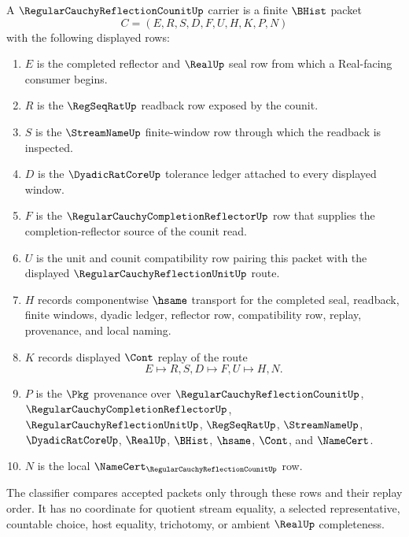 \begin{definition}
\label{def:regular-cauchy-reflection-counit-carrier}
A $\RegularCauchyReflectionCounitUp$ carrier is a finite $\BHist$ packet
$$
C=(E,R,S,D,F,U,H,K,P,N)
$$
with the following displayed rows:
\begin{enumerate}
\item $E$ is the completed reflector and $\RealUp$ seal row from which a Real-facing consumer begins.
\item $R$ is the $\RegSeqRatUp$ readback row exposed by the counit.
\item $S$ is the $\StreamNameUp$ finite-window row through which the readback is inspected.
\item $D$ is the $\DyadicRatCoreUp$ tolerance ledger attached to every displayed window.
\item $F$ is the $\RegularCauchyCompletionReflectorUp$ row that supplies the completion-reflector source of the counit read.
\item $U$ is the unit and counit compatibility row pairing this packet with the displayed $\RegularCauchyReflectionUnitUp$ route.
\item $H$ records componentwise $\hsame$ transport for the completed seal, readback, finite windows, dyadic ledger, reflector row, compatibility row, replay, provenance, and local naming.
\item $K$ records displayed $\Cont$ replay of the route
$$
E \longmapsto R,S,D \longmapsto F,U \longmapsto H,N .
$$
\item $P$ is the $\Pkg$ provenance over $\RegularCauchyReflectionCounitUp$, $\RegularCauchyCompletionReflectorUp$, $\RegularCauchyReflectionUnitUp$, $\RegSeqRatUp$, $\StreamNameUp$, $\DyadicRatCoreUp$, $\RealUp$, $\BHist$, $\hsame$, $\Cont$, and $\NameCert$.
\item $N$ is the local $\NameCert_{\RegularCauchyReflectionCounitUp}$ row.
\end{enumerate}
The classifier compares accepted packets only through these rows and their replay order. It has no coordinate for quotient stream equality, a selected representative, countable choice, host equality, trichotomy, or ambient $\RealUp$ completeness.
\end{definition}

